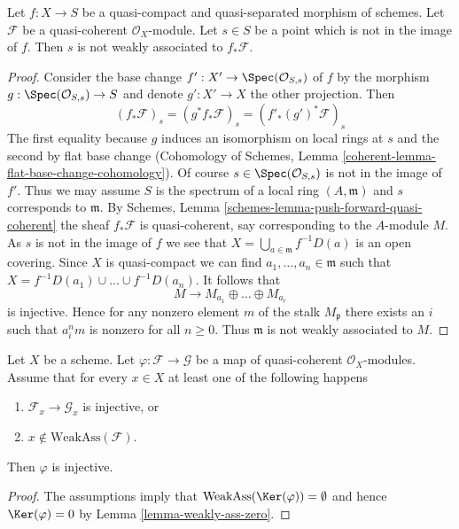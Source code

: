 \begin{lemma}
\label{lemma-weakass-pushforward}
Let $f : X \to S$ be a quasi-compact and quasi-separated morphism of schemes.
Let $\mathcal{F}$ be a quasi-coherent $\mathcal{O}_X$-module.
Let $s \in S$ be a point which is not in the image of $f$. Then
$s$ is not weakly associated to $f_*\mathcal{F}$.
\end{lemma}

\begin{proof}
Consider the base change $f' : X' \to \Spec(\mathcal{O}_{S, s})$
of $f$ by the morphism $g : \Spec(\mathcal{O}_{S, s}) \to S$
and denote $g' : X' \to X$ the other projection.
Then
$$
(f_*\mathcal{F})_s = (g^*f_*\mathcal{F})_s = (f'_*(g')^*\mathcal{F})_s
$$
The first equality because $g$ induces an isomorphism on local
rings at $s$ and the second by flat base change (Cohomology of Schemes, Lemma
\ref{coherent-lemma-flat-base-change-cohomology}). Of course
$s \in \Spec(\mathcal{O}_{S, s})$ is not in the image of $f'$.
Thus we may assume $S$ is the spectrum of a local ring
$(A, \mathfrak m)$ and $s$ corresponds to $\mathfrak m$.
By Schemes, Lemma \ref{schemes-lemma-push-forward-quasi-coherent}
the sheaf $f_*\mathcal{F}$ is quasi-coherent, say corresponding
to the $A$-module $M$. As $s$ is not in the image of $f$ we see that
$X = \bigcup_{a \in \mathfrak m} f^{-1}D(a)$ is an open covering.
Since $X$ is quasi-compact we can find $a_1, \ldots, a_n \in \mathfrak m$
such that $X = f^{-1}D(a_1) \cup \ldots \cup f^{-1}D(a_n)$. It follows
that
$$
M \to M_{a_1} \oplus \ldots \oplus M_{a_r}
$$
is injective. Hence for any nonzero element $m$ of the stalk $M_\mathfrak p$
there exists an $i$ such that $a_i^n m$ is nonzero for all $n \geq 0$.
Thus $\mathfrak m$ is not weakly associated to $M$.
\end{proof}

\begin{lemma}
\label{lemma-check-injective-on-weakass}
Let $X$ be a scheme. Let $\varphi : \mathcal{F} \to \mathcal{G}$ be a map of
quasi-coherent $\mathcal{O}_X$-modules. Assume that for every $x \in X$
at least one of the following happens
\begin{enumerate}
\item $\mathcal{F}_x \to \mathcal{G}_x$ is injective, or
\item $x \not \in \text{WeakAss}(\mathcal{F})$.
\end{enumerate}
Then $\varphi$ is injective.
\end{lemma}

\begin{proof}
The assumptions imply that $\text{WeakAss}(\Ker(\varphi)) = \emptyset$
and hence $\Ker(\varphi) = 0$ by Lemma \ref{lemma-weakly-ass-zero}.
\end{proof}

